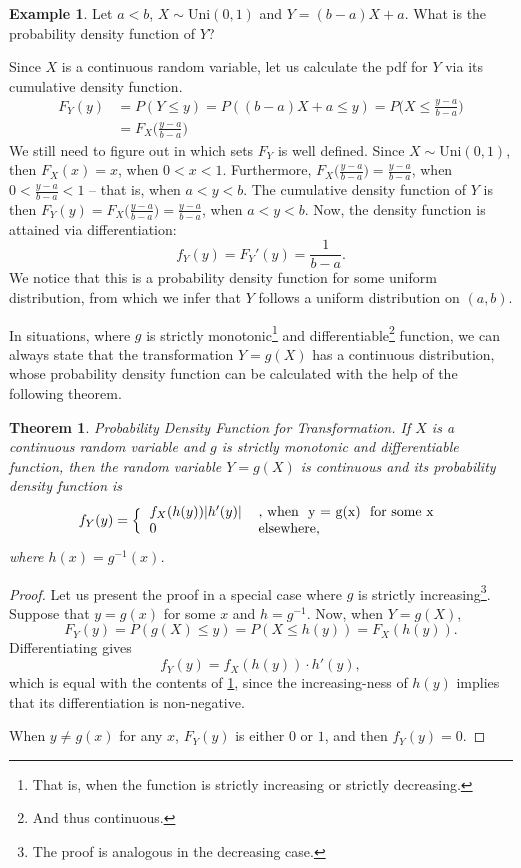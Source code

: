 \documentclass[12pt,a4paper,leqno]{report}
\theoremstyle{plain}
\newtheorem{lause}[equation]{Theorem}
\theoremstyle{definition}
\newtheorem{esim}[equation]{Example}
\begin{document}
\begin{esim}
Let $a < b$, $X \sim \text{Uni}(0,1)$ and $Y = (b-a)X + a$. What is the probability density function of $Y$?

Since $X$ is a continuous random variable, let us calculate the pdf for $Y$ via its cumulative density function.
\[
\begin{split}
F_Y(y) &= P(Y \leq y) = P((b-a)X + a \leq y) = P\Big(X \leq \frac{y-a}{b-a} \Big) \\
&= F_X\Big(\frac{y-a}{b-a}\Big)
\end{split}
\]
We still need to figure out in which sets $F_Y$ is well defined. Since $X \sim \text{Uni}(0,1)$, then $F_X(x) = x$, when $0 < x < 1$. Furthermore, $F_X\big(\frac{y-a}{b-a}\big) = \frac{y-a}{b-a}$, when $0 < \frac{y-a}{b-a} < 1$ -- that is, when $a < y < b$. The cumulative density function of $Y$ is then $F_Y(y) = F_X\big(\frac{y-a}{b-a}\big) = \frac{y-a}{b-a}$, when $a < y < b$. Now, the density function is attained via differentiation:
\[
f_Y(y) = F_Y'(y) = \frac{1}{b-a}.
\]
We notice that this is a probability density function for some uniform distribution, from which we infer that $Y$ follows a uniform distribution on $(a,b)$.
\end{esim}

In situations, where $g$ is strictly monotonic\footnote{That is, when the function is strictly increasing or strictly decreasing.} and differentiable\footnote{And thus continuous.} function, we can always state that the transformation $Y = g(X)$ has a continuous distribution, whose probability density function can be calculated with the help of the following theorem.

\begin{lause}\label{lause:trans_pdf}
Probability Density Function for Transformation. If $X$ is a continuous random variable and $g$ is strictly monotonic and differentiable function, then the random variable $Y = g(X)$ is continuous and its probability density function is
\[
f_Y(y) = \Big\{
  \begin{tabular}{ll}
  $f_X(h(y))|h'(y)|$ & \text{, when } y = g(x) \text{ for some }x  \\
  0 & \text{elsewhere,}  
  \end{tabular}
\]
where $h(x) = g^{-1}(x)$.
\end{lause}

\begin{proof}
Let us present the proof in a special case where $g$ is strictly increasing\footnote{The proof is analogous in the decreasing case.}. Suppose that $y = g(x)$ for some $x$ and $h = g^{-1}$. Now, when $Y = g(X)$, 
\[
F_Y(y) = P(g(X) \leq y) = P(X \leq h(y)) = F_X(h(y)).
\]
Differentiating gives
\[
f_Y(y) = f_X(h(y))\cdot h'(y),
\]
which is equal with the contents of \ref{lause:trans_pdf}, since the increasing-ness of $h(y)$ implies that its differentiation is non-negative.

When $y \neq g(x)$ for any $x$, $F_Y(y)$ is either $0$ or $1$, and then $f_Y(y) = 0$.
\end{proof}
\end{document}
